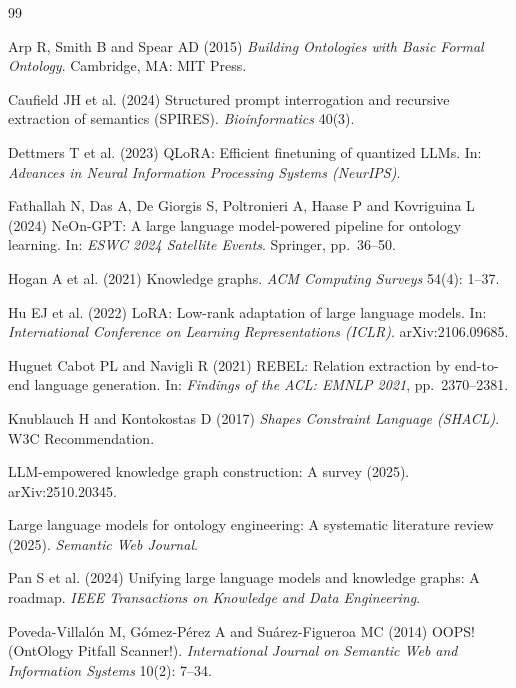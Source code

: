 \documentclass[Afour,sageh,times]{sagej}
\begin{document}
\begin{thebibliography}{99}

Arp R, Smith B and Spear AD (2015) \textit{Building Ontologies with Basic Formal Ontology}.
Cambridge, MA: MIT Press.

Caufield JH et al. (2024) Structured prompt interrogation and recursive extraction of semantics
(SPIRES). \textit{Bioinformatics} 40(3).

Dettmers T et al. (2023) QLoRA: Efficient finetuning of quantized LLMs. In: \textit{Advances in
Neural Information Processing Systems (NeurIPS)}.

Fathallah N, Das A, De Giorgis S, Poltronieri A, Haase P and Kovriguina L (2024) NeOn-GPT: A large
language model-powered pipeline for ontology learning. In: \textit{ESWC 2024 Satellite Events}.
Springer, pp.\ 36--50.

Hogan A et al. (2021) Knowledge graphs. \textit{ACM Computing Surveys} 54(4): 1--37.

Hu EJ et al. (2022) LoRA: Low-rank adaptation of large language models. In: \textit{International
Conference on Learning Representations (ICLR)}. arXiv:2106.09685.

Huguet Cabot PL and Navigli R (2021) REBEL: Relation extraction by end-to-end language generation.
In: \textit{Findings of the ACL: EMNLP 2021}, pp.\ 2370--2381.

Knublauch H and Kontokostas D (2017) \textit{Shapes Constraint Language (SHACL)}. W3C Recommendation.

LLM-empowered knowledge graph construction: A survey (2025). arXiv:2510.20345.

Large language models for ontology engineering: A systematic literature review (2025).
\textit{Semantic Web Journal}.

Pan S et al. (2024) Unifying large language models and knowledge graphs: A roadmap. \textit{IEEE
Transactions on Knowledge and Data Engineering}.

Poveda-Villal\'on M, G\'omez-P\'erez A and Su\'arez-Figueroa MC (2014) OOPS! (OntOlogy Pitfall
Scanner!). \textit{International Journal on Semantic Web and Information Systems} 10(2): 7--34.


\end{thebibliography}
\end{document}
